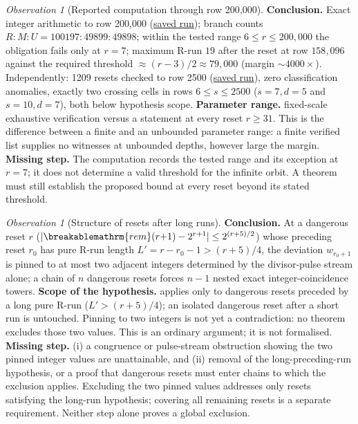 \documentclass[11pt]{article}
\theoremstyle{plain}
\theoremstyle{definition}
\theoremstyle{remark}
\newtheorem{obs}[thm]{Observation}
\renewcommand{\mathrm}[1]{\ifmmode\breakablemathrm{#1}\else\textrm{#1}\fi}%
\begin{document}
\begin{obs}[Reported computation through row 200{,}000]
\textbf{Conclusion.} Exact integer arithmetic to row 200{,}000
(\href{https://github.com/wcook04/plectis-erdos/blob/f757115e03bebe5c04431a147da559015c680a37/research/experiments/erdos257/receipts/seam-orbit-200000.json}{saved run}); branch counts $R\!:\!M\!:\!U =
100197\!:\!49899\!:\!49898$; within the tested range $6\le r\le200{,}000$ the obligation fails only at $r=7$; maximum R-run $19$ after the reset at row
$158{,}096$ against the required threshold $\approx (r-3)/2 \approx 79{,}000$ (margin
$\sim\!4000\times$). Independently: 1209 resets checked to row 2500
(\href{https://github.com/wcook04/plectis-erdos/blob/f757115e03bebe5c04431a147da559015c680a37/research/experiments/erdos257/receipts/seam-reset-crossing-2500.json}{saved run}), zero classification
anomalies, exactly two crossing cells in rows $6\le s\le2500$ ($s{=}7,d{=}5$ and $s{=}10,d{=}7$), both below hypothesis
scope.
\textbf{Parameter range.} fixed-scale exhaustive verification versus a statement
at every reset $r \ge 31$.  This is the difference between a finite and an unbounded
parameter range: a finite verified list supplies no witnesses at unbounded depths, however
large the margin.
\textbf{Missing step.} The computation records the tested range and its
exception at $r=7$; it does not determine a valid threshold for the infinite
orbit. A theorem must still establish the proposed bound at every reset
beyond its stated threshold.
\end{obs}

\begin{obs}[Structure of resets after long runs]
\textbf{Conclusion.} At a dangerous reset $r$ ($|\mathrm{rem}(r{+}1)-2^{r+1}| \le 2^{(r+5)/2}$) whose
preceding reset $r_0$ has pure R-run length $L' = r-r_0-1 > (r+5)/4$, the deviation
$w_{r_0+1}$ is pinned to at most two adjacent integers determined by the divisor-pulse stream
alone; a chain of $n$ dangerous resets forces $n{-}1$ nested exact integer-coincidence towers.
\textbf{Scope of the hypothesis.} applies only to dangerous resets preceded by a
long pure R-run ($L' > (r+5)/4$); an isolated dangerous reset after a short run is untouched.
Pinning to two integers is not yet a contradiction: no theorem excludes those two values.  This is
an ordinary argument; it is not formalised.
\textbf{Missing step.} (i) a congruence or pulse-stream obstruction showing the two pinned integer
values are unattainable, and (ii) removal of the long-preceding-run hypothesis, or a proof that
dangerous resets must enter chains to which the exclusion applies.
Excluding the two pinned values addresses only resets satisfying the
long-run hypothesis; covering all remaining resets is a separate
requirement.  Neither step alone proves a global exclusion.
\end{obs}
\end{document}
